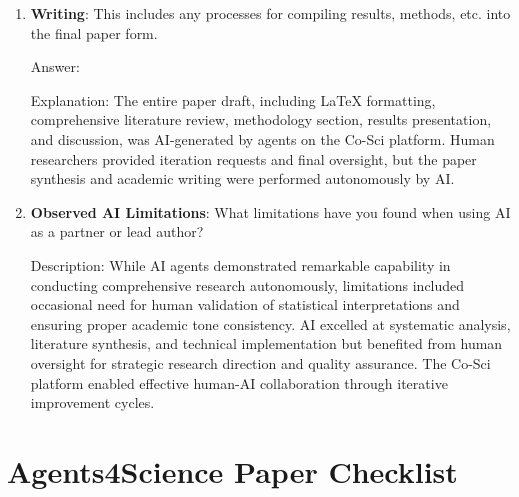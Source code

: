 \documentclass{article}
\begin{document}
\begin{enumerate}
    Answer: \involvementC{} %
    
    Explanation: All statistical analysis, effect size calculations, data visualization, and scientific interpretation of degradation patterns were performed by AI agents. The comprehensive multi-dimensional analysis, identification of compensatory effects, and research implications were AI-generated. Human oversight ensured scientific rigor and called for additional analysis iterations.

    \item \textbf{Writing}: This includes any processes for compiling results, methods, etc. into the final paper form.

    Answer: \involvementC{} %
    
    Explanation: The entire paper draft, including LaTeX formatting, comprehensive literature review, methodology section, results presentation, and discussion, was AI-generated by agents on the Co-Sci platform. Human researchers provided iteration requests and final oversight, but the paper synthesis and academic writing were performed autonomously by AI.

    \item \textbf{Observed AI Limitations}: What limitations have you found when using AI as a partner or lead author?

    Description: While AI agents demonstrated remarkable capability in conducting comprehensive research autonomously, limitations included occasional need for human validation of statistical interpretations and ensuring proper academic tone consistency. AI excelled at systematic analysis, literature synthesis, and technical implementation but benefited from human oversight for strategic research direction and quality assurance. The Co-Sci platform enabled effective human-AI collaboration through iterative improvement cycles.
\end{enumerate}

\newpage

\section*{Agents4Science Paper Checklist}
\end{document}
